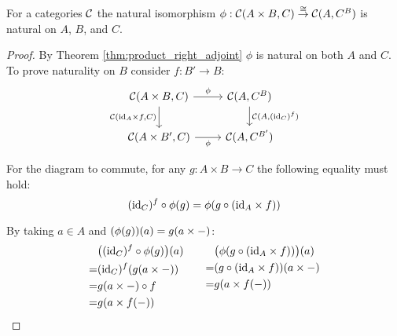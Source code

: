 \begin{theorem}
  For a categories $\mathcal{C}$ the natural isomorphism $\phi:\mathcal{C}(A\times B, C)
  \overset{\cong}{\to}\mathcal{C}(A, C^B)$ is natural on $A$, $B$, and $C$.

  \begin{proof}
    By Theorem \ref{thm:product_right_adjoint} $\phi$ is natural on both $A$ and
    $C$. To prove naturality on $B$ consider $f:B' \to B$:
    \[\begin{tikzcd}[ampersand replacement=\&]
      {\C(A\times B, C)} \& {\C(A, C^B)} \\
      {\C(A\times B',C)} \& {\C(A, C^{B'})}
      \arrow["{\C(A, (\id_C)^f)}", from=1-2, to=2-2]
      \arrow["\phi", from=1-1, to=1-2]
      \arrow["{\C(\id_A\times f, C)}"', from=1-1, to=2-1]
      \arrow["\phi"', from=2-1, to=2-2]
    \end{tikzcd}\]

    For the diagram to commute, for any $g:A\times B\to C$ the following
    equality must hold:
    \[(\mathrm{id}_C)^f\circ\phi(g) = \phi(g\circ (\mathrm{id}_A\times f))\]

    By taking $a\in A$ and $(\phi(g))(a) = g(a\times{\--})$:
    \[
      \begin{aligned}[t]
        &\big((\mathrm{id}_C)^f\circ\phi(g)\big)(a)\\
        =& (\mathrm{id}_C)^f(g(a\times{\--}))\\
        =& g(a\times{\--}) \circ f\\
        =& g(a\times f({\--}))
      \end{aligned}
      \qquad
      \begin{aligned}[t]
        &\big(\phi(g\circ (\mathrm{id}_A\times f))\big)(a)\\
        =& (g\circ (\mathrm{id}_A\times f))(a\times {\--})\\
        =& g (a\times f({\--}))\\
      \end{aligned}
    \]
  \end{proof}
  \vspace{-\baselineskip}
\end{theorem}